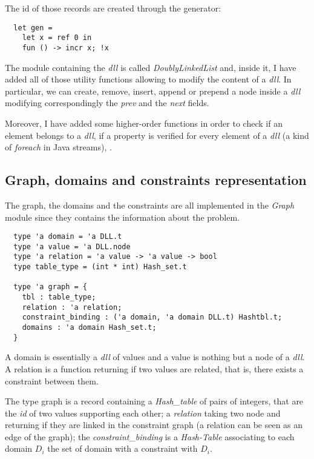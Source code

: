 \documentclass{rapport}
\begin{document}
The id of those records are created through the generator:

\begin{verbatim}
  let gen =
    let x = ref 0 in
    fun () -> incr x; !x
\end{verbatim}

The module containing the \textit{dll} is called \textit{DoublyLinkedList} and, inside it, I have added all of those utility functions allowing to modify the content of a \textit{dll}. In particular, we can create, remove, insert, append or prepend a node inside a \textit{dll} modifying correspondingly the \textit{prev} and the \textit{next} fields.

Moreover, I have added some higher-order functions in order to check if an element belongs to a \textit{dll}, if a property is verified for every element of a \textit{dll} (a kind of \textit{foreach} in Java streams), \etc.

\subsection{Graph, domains and constraints representation}

The graph, the domains and the constraints are all implemented in the \textit{Graph} module since they contains the information about the problem.

\begin{verbatim}
  type 'a domain = 'a DLL.t
  type 'a value = 'a DLL.node
  type 'a relation = 'a value -> 'a value -> bool
  type table_type = (int * int) Hash_set.t

  type 'a graph = {
    tbl : table_type;
    relation : 'a relation;
    constraint_binding : ('a domain, 'a domain DLL.t) Hashtbl.t;
    domains : 'a domain Hash_set.t;
  }
\end{verbatim}

A domain is essentially a \textit{dll} of values and a value is nothing but a node of a \textit{dll}. A relation is a function returning if two values are related, that is, there exists a constraint between them.

The type graph is a record containing a \textit{Hash\_table} of pairs of integers, that are the \textit{id} of two values supporting each other; a \textit{relation} taking two node and returning if they are linked in the constraint graph (a relation can be seen as an edge of the graph); the \textit{constraint\_binding} is a \textit{Hash-Table} associating to each domain $D_i$ the set of domain with a constraint with $D_i$.
\end{document}
